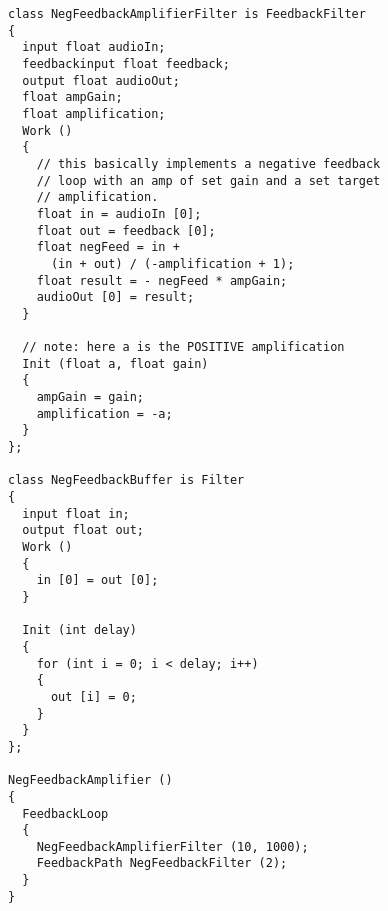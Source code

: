 \documentclass[twocolumn, draft]{article}
\begin{document}
\begin{verbatim}
class NegFeedbackAmplifierFilter is FeedbackFilter
{
  input float audioIn;
  feedbackinput float feedback;
  output float audioOut;
  float ampGain;
  float amplification;
  Work ()
  {
    // this basically implements a negative feedback
    // loop with an amp of set gain and a set target
    // amplification.
    float in = audioIn [0];
    float out = feedback [0];
    float negFeed = in + 
      (in + out) / (-amplification + 1);
    float result = - negFeed * ampGain;
    audioOut [0] = result;
  }

  // note: here a is the POSITIVE amplification
  Init (float a, float gain)
  {
    ampGain = gain;
    amplification = -a;
  }
};

class NegFeedbackBuffer is Filter
{
  input float in;
  output float out;
  Work ()
  {
    in [0] = out [0];
  }

  Init (int delay)
  {
    for (int i = 0; i < delay; i++)
    {
      out [i] = 0;
    }
  }
};

NegFeedbackAmplifier ()
{
  FeedbackLoop
  {
    NegFeedbackAmplifierFilter (10, 1000);
    FeedbackPath NegFeedbackFilter (2);
  }
}
\end{verbatim}



\begin{comment}

\begin{figure}[t]
\centerline{\psfig{figure=block.ps}}
\vspace{-24pt}
\caption{\protect\small The block construct.}
\end{figure}

\section{old stuff}

\begin{lgrind}

\end{lgrind}

\end{comment}
\end{document}
